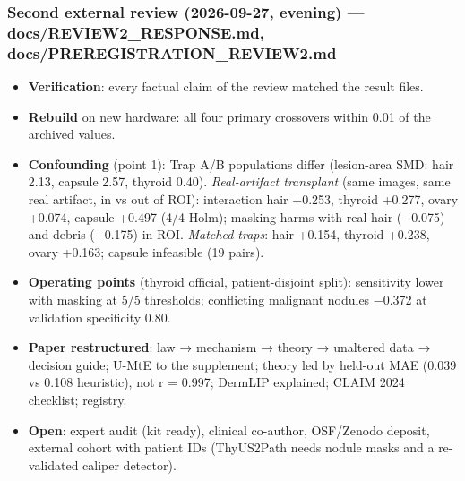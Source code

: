 {\subsubsection{Second external review (2026-09-27, evening) --- docs/REVIEW2\_RESPONSE.md, docs/PREREGISTRATION\_REVIEW2.md}\label{second-external-review-2026-09-27-evening--docsreview2_responsemd-docspreregistration_review2md}

\begin{itemize}

\item
  \textbf{Verification}: every factual claim of the review matched the result files.
\item
  \textbf{Rebuild} on new hardware: all four primary crossovers within 0.01 of the archived values.
\item
  \textbf{Confounding} (point 1): Trap A/B populations differ (lesion-area SMD: hair 2.13, capsule 2.57, thyroid 0.40).
  \emph{Real-artifact transplant} (same images, same real artifact, in vs out of ROI): interaction hair +0.253, thyroid
  +0.277, ovary +0.074, capsule +0.497 (4/4 Holm); masking harms with real hair (−0.075) and debris (−0.175) in-ROI.
  \emph{Matched traps}: hair +0.154, thyroid +0.238, ovary +0.163; capsule infeasible (19 pairs).
\item
  \textbf{Operating points} (thyroid official, patient-disjoint split): sensitivity lower with masking at 5/5 thresholds;
  conflicting malignant nodules −0.372 at validation specificity 0.80.
\item
  \textbf{Paper restructured}: law → mechanism → theory → unaltered data → decision guide; U-MtE to the supplement; theory
  led by held-out MAE (0.039 vs 0.108 heuristic), not r = 0.997; DermLIP explained; CLAIM 2024 checklist; registry.
\item
  \textbf{Open}: expert audit (kit ready), clinical co-author, OSF/Zenodo deposit, external cohort with patient IDs
  (ThyUS2Path needs nodule masks and a re-validated caliper detector).
\end{itemize}

}
